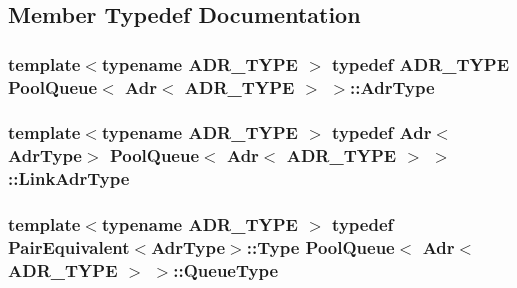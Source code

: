 \subsection{Member Typedef Documentation}
\hypertarget{structPoolQueue_3_01Adr_3_01ADR__TYPE_01_4_01_4_a064c3ab93d00612f59153ae3e22f8cce}{
\subsubsection[{Adr\-Type}]{\setlength{\rightskip}{0pt plus 5cm}template$<$typename A\-D\-R\-\_\-\-T\-Y\-P\-E $>$ typedef A\-D\-R\-\_\-\-T\-Y\-P\-E {\bf Pool\-Queue}$<$ {\bf Adr}$<$ A\-D\-R\-\_\-\-T\-Y\-P\-E $>$ $>$\-::{\bf Adr\-Type}}}\label{structPoolQueue_3_01Adr_3_01ADR__TYPE_01_4_01_4_a064c3ab93d00612f59153ae3e22f8cce}
\hypertarget{structPoolQueue_3_01Adr_3_01ADR__TYPE_01_4_01_4_a0186dae81484804c84ead6583955fe6c}{
\subsubsection[{Link\-Adr\-Type}]{\setlength{\rightskip}{0pt plus 5cm}template$<$typename A\-D\-R\-\_\-\-T\-Y\-P\-E $>$ typedef {\bf Adr}$<${\bf Adr\-Type}$>$ {\bf Pool\-Queue}$<$ {\bf Adr}$<$ A\-D\-R\-\_\-\-T\-Y\-P\-E $>$ $>$\-::{\bf Link\-Adr\-Type}}}\label{structPoolQueue_3_01Adr_3_01ADR__TYPE_01_4_01_4_a0186dae81484804c84ead6583955fe6c}
\hypertarget{structPoolQueue_3_01Adr_3_01ADR__TYPE_01_4_01_4_af405a8f20e7744630ddff4f0dd7a215a}{
\subsubsection[{Queue\-Type}]{\setlength{\rightskip}{0pt plus 5cm}template$<$typename A\-D\-R\-\_\-\-T\-Y\-P\-E $>$ typedef {\bf Pair\-Equivalent}$<${\bf Adr\-Type}$>$\-::Type {\bf Pool\-Queue}$<$ {\bf Adr}$<$ A\-D\-R\-\_\-\-T\-Y\-P\-E $>$ $>$\-::{\bf Queue\-Type}}}\label{structPoolQueue_3_01Adr_3_01ADR__TYPE_01_4_01_4_af405a8f20e7744630ddff4f0dd7a215a}
